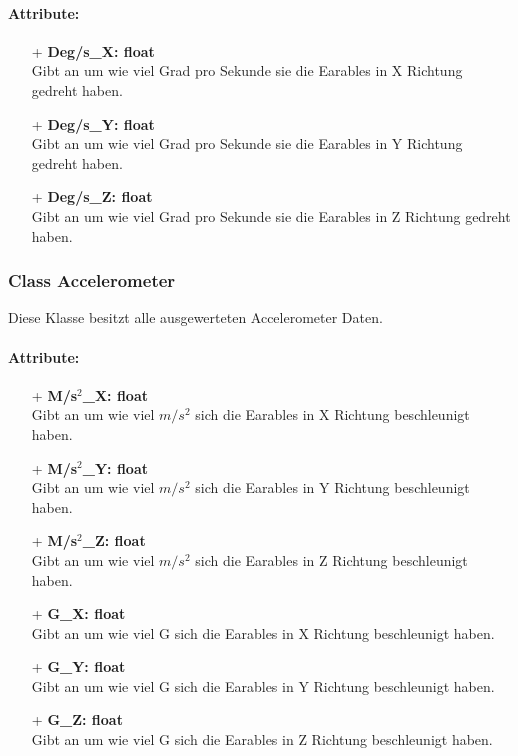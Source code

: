 \documentclass[a4paper,12pt]{article}
\begin{document}
\paragraph{Attribute:}
\begin{itemize}
	\item[+] \textbf{Deg/s\_X: float}\\Gibt an um wie viel Grad pro Sekunde sie die \Gls{Earables} in X Richtung gedreht haben.
	\item[+] \textbf{Deg/s\_Y: float}\\Gibt an um wie viel Grad pro Sekunde sie die \Gls{Earables} in Y Richtung gedreht haben.
	\item[+] \textbf{Deg/s\_Z: float}\\Gibt an um wie viel Grad pro Sekunde sie die \Gls{Earables} in Z Richtung gedreht haben.
\end{itemize}


\subsubsection{Class Accelerometer}
Diese Klasse besitzt alle ausgewerteten Accelerometer Daten.

\paragraph{Attribute:}
\begin{itemize}
	\item[+] \textbf{M/s$^2$\_X: float}\\Gibt an um wie viel $m/s^2$ sich die \Gls{Earables} in X Richtung beschleunigt haben.
	\item[+] \textbf{M/s$^2$\_Y: float}\\Gibt an um wie viel $m/s^2$ sich die \Gls{Earables} in Y Richtung beschleunigt haben.
	\item[+] \textbf{M/s$^2$\_Z: float}\\Gibt an um wie viel $m/s^2$ sich die \Gls{Earables} in Z Richtung beschleunigt haben.
	\item[+] \textbf{G\_X: float}\\Gibt an um wie viel G sich die \Gls{Earables} in X Richtung beschleunigt haben.
	\item[+] \textbf{G\_Y: float}\\Gibt an um wie viel G sich die \Gls{Earables} in Y Richtung beschleunigt haben.
	\item[+] \textbf{G\_Z: float}\\Gibt an um wie viel G sich die \Gls{Earables} in Z Richtung beschleunigt haben.
\end{itemize}
\end{document}
